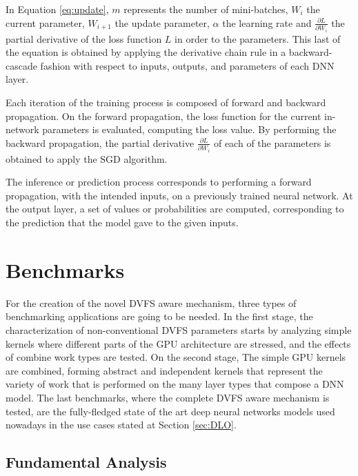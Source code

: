 In Equation \ref{eq:update}, $m$ represents the number of mini-batches, $W_i$ the current parameter, $W_{i+1}$ the update parameter, $\alpha$ the learning rate and $\frac{\partial L}{\partial W_i}$ the partial derivative of the loss function $L$ in order to the parameters. This last of the equation is obtained by applying the derivative chain rule in a backward-cascade fashion with respect to inputs, outputs, and parameters of each DNN layer.

Each iteration of the training process is composed of forward and backward propagation. On the forward propagation, the loss function for the current in-network parameters is evaluated, computing the loss value. By performing the backward propagation, the partial derivative $\frac{\partial L}{\partial W_i}$ of each of the parameters is obtained to apply the SGD algorithm. 

The inference or prediction process corresponds to performing a forward propagation, with the intended inputs, on a previously trained neural network. At the output layer, a set of values or probabilities are computed, corresponding to the prediction that the model gave to the given inputs.

\section{Benchmarks}

For the creation of the novel DVFS aware mechanism, three types of benchmarking applications are going to be needed. In the first stage, the characterization of non-conventional DVFS parameters starts by analyzing simple kernels where different parts of the GPU architecture are stressed, and the effects of combine work types are tested. On the second stage, The simple GPU kernels are combined, forming abstract and independent kernels that represent the variety of work that is performed on the many layer types that compose a DNN model. The last benchmarks, where the complete DVFS aware mechanism is tested, are the fully-fledged state of the art deep neural networks models used nowadays in the use cases stated at Section \ref{sec:DLO}.

\subsection{Fundamental Analysis}


